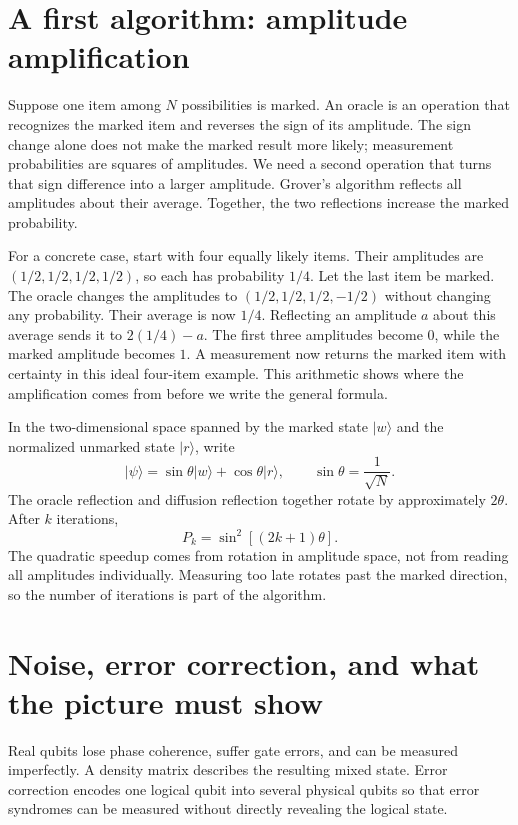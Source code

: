 \documentclass[11pt,oneside]{book}
\newcommand{\ket}[1]{\lvert #1\rangle}
\theoremstyle{reviewstyle}
\begin{document}
\section{A first algorithm: amplitude amplification}
Suppose one item among $N$ possibilities is marked. An oracle is an operation that recognizes the marked item and reverses the sign of its amplitude. The sign change alone does not make the marked result more likely; measurement probabilities are squares of amplitudes. We need a second operation that turns that sign difference into a larger amplitude. Grover's algorithm reflects all amplitudes about their average. Together, the two reflections increase the marked probability.

For a concrete case, start with four equally likely items. Their amplitudes are $(1/2,1/2,1/2,1/2)$, so each has probability $1/4$. Let the last item be marked. The oracle changes the amplitudes to $(1/2,1/2,1/2,-1/2)$ without changing any probability. Their average is now $1/4$. Reflecting an amplitude $a$ about this average sends it to $2(1/4)-a$. The first three amplitudes become $0$, while the marked amplitude becomes $1$. A measurement now returns the marked item with certainty in this ideal four-item example. This arithmetic shows where the amplification comes from before we write the general formula.

In the two-dimensional space spanned by the marked state $\ket w$ and the normalized unmarked state $\ket r$, write
\begin{equation}
\ket\psi=\sin\theta\ket w+\cos\theta\ket r,
\qquad \sin\theta=\frac1{\sqrt N}.
\end{equation}
The oracle reflection and diffusion reflection together rotate by approximately $2\theta$. After $k$ iterations,
\begin{equation}
P_k=\sin^2[(2k+1)\theta].
\end{equation}
The quadratic speedup comes from rotation in amplitude space, not from reading all amplitudes individually. Measuring too late rotates past the marked direction, so the number of iterations is part of the algorithm.

\section{Noise, error correction, and what the picture must show}
Real qubits lose phase coherence, suffer gate errors, and can be measured imperfectly. A density matrix describes the resulting mixed state. Error correction encodes one logical qubit into several physical qubits so that error syndromes can be measured without directly revealing the logical state.
\end{document}
